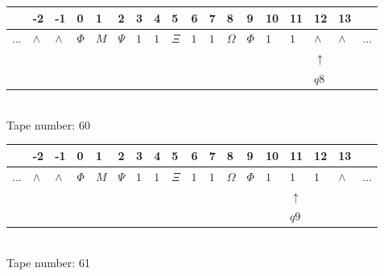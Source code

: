 \documentclass[11pt]{article}
\begin{document}
\begin{table}[H]
\centering
\begin{tabular}{llllllllllllllllll}
 & -2 & -1 & 0 & 1 & 2 & 3 & 4 & 5 & 6 & 7 & 8 & 9 & 10 & 11 & 12 & 13 & \\
\hline
$...$ & \multicolumn{1}{|l|}{$\wedge$} & \multicolumn{1}{|l|}{$\wedge$} & \multicolumn{1}{|l|}{$\Phi$} & \multicolumn{1}{|l|}{$M$} & \multicolumn{1}{|l|}{$\Psi$} & \multicolumn{1}{|l|}{$1$} & \multicolumn{1}{|l|}{$1$} & \multicolumn{1}{|l|}{$\Xi$} & \multicolumn{1}{|l|}{$1$} & \multicolumn{1}{|l|}{$1$} & \multicolumn{1}{|l|}{$\Omega$} & \multicolumn{1}{|l|}{$\Phi$} & \multicolumn{1}{|l|}{$1$} & \multicolumn{1}{|l|}{$1$} & \multicolumn{1}{|l|}{$\wedge$} & \multicolumn{1}{|l|}{$\wedge$} & $...$\\
\hline
&  &  &  &  &  &  &  &  &  &  &  &  &  &  & $\uparrow$ &  &  \\
&  &  &  &  &  &  &  &  &  &  &  &  &  &  & $ q8 $ &  &  \\
\end{tabular}
\\
Tape number: 60
\noindent\makebox[\linewidth]{\hdashrule{\textwidth}{1pt}{1pt}}\end{table}

\begin{table}[H]
\centering
\begin{tabular}{llllllllllllllllll}
 & -2 & -1 & 0 & 1 & 2 & 3 & 4 & 5 & 6 & 7 & 8 & 9 & 10 & 11 & 12 & 13 & \\
\hline
$...$ & \multicolumn{1}{|l|}{$\wedge$} & \multicolumn{1}{|l|}{$\wedge$} & \multicolumn{1}{|l|}{$\Phi$} & \multicolumn{1}{|l|}{$M$} & \multicolumn{1}{|l|}{$\Psi$} & \multicolumn{1}{|l|}{$1$} & \multicolumn{1}{|l|}{$1$} & \multicolumn{1}{|l|}{$\Xi$} & \multicolumn{1}{|l|}{$1$} & \multicolumn{1}{|l|}{$1$} & \multicolumn{1}{|l|}{$\Omega$} & \multicolumn{1}{|l|}{$\Phi$} & \multicolumn{1}{|l|}{$1$} & \multicolumn{1}{|l|}{$1$} & \multicolumn{1}{|l|}{$1$} & \multicolumn{1}{|l|}{$\wedge$} & $...$\\
\hline
&  &  &  &  &  &  &  &  &  &  &  &  &  & $\uparrow$ &  &  &  \\
&  &  &  &  &  &  &  &  &  &  &  &  &  & $ q9 $ &  &  &  \\
\end{tabular}
\\
Tape number: 61
\noindent\makebox[\linewidth]{\hdashrule{\textwidth}{1pt}{1pt}}\end{table}
\end{document}
